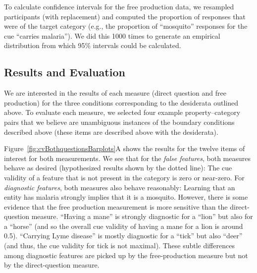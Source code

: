 \documentclass[english,,man,floatsintext]{apa6}
\theoremstyle{definition}
\theoremstyle{definition}
\theoremstyle{definition}
\theoremstyle{remark}
\begin{document}
To calculate confidence intervals for the free production data, we
resampled participants (with replacement) and computed the proportion of
responses that were of the target category (e.g., the proportion of
\enquote{mosquito} responses for the cue \enquote{carries malaria}). We
did this 1000 times to generate an empirical distribution from which
95\% intervals could be calculated.

\hypertarget{results-and-evaluation}{%
\subsection{Results and Evaluation}\label{results-and-evaluation}}

We are interested in the results of each measure (direct question and
free production) for the three conditions corresponding to the
desiderata outlined above. To evaluate each measure, we selected four
example property--category pairs that we believe are unambiguous
instances of the boundary conditions described above (these items are
described above with the desiderata).

Figure~\ref{fig:cvBothquestionsBarplots}A shows the results for the
twelve items of interest for both measurements. We see that for the
\emph{false features}, both measures behave as desired (hypothesized
results shown by the dotted line): The cue validity of a feature that is
not present in the category is zero or near-zero. For \emph{diagnostic
features}, both measures also behave reasonably: Learning that an entity
has malaria strongly implies that it is a mosquito. However, there is
some evidence that the free production measurement is more sensitive
than the direct-question measure. \enquote{Having a mane} is strongly
diagnostic for a \enquote{lion} but also for a \enquote{horse} (and so
the overall cue validity of having a mane for a lion is around 0.5).
\enquote{Carrying Lyme disease} is mostly diagnostic for a
\enquote{tick} but also \enquote{deer} (and thus, the cue validity for
tick is not maximal). These subtle differences among diagnostic features
are picked up by the free-production measure but not by the
direct-question measure.
\end{document}
